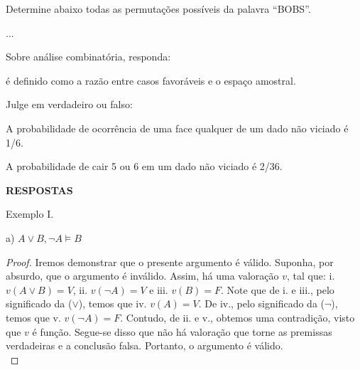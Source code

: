 \documentclass[12pt]{exam} %
\newcommand{\tf}[1][{}]{                  %
    \fillin[#1][0.25in]
}
\begin{document}
\begin{questions}
\question Determine abaixo todas as permutações possíveis da palavra \enquote{BOBS}.

\begin{solutionorbox}[1.5cm]
    ...
\end{solutionorbox}


\question Sobre análise combinatória, responda:

\question \fillin[Probabilidade] é definido como a razão entre casos favoráveis e o espaço amostral. 

\question Julge em verdadeiro ou falso:
    \begin{parts}
        \item \tf[T] A probabilidade de ocorrência de uma face qualquer de um dado não viciado é 1/6.
        \item \tf[F] A probabilidade de cair 5 ou 6 em um dado não viciado é 2/36.
    \end{parts}



\end{questions}

\vspace{1cm}
\noindent \textbf{RESPOSTAS}

Exemplo I.

\bigskip

a) $A \lor B, \neg A \vDash B$

\begin{proof}
Iremos demonstrar que o presente argumento é válido. Suponha, por absurdo, que o argumento é inválido. Assim, há uma valoração $v$, tal que:
i. $v(A\lor B)=V$, 
ii. $v(\neg A)=V$ e 
iii. $v(B)=F$. Note que de i. e iii., pelo significado da ($\lor$), temos que iv. $v(A)=V$. De iv., pelo significado da ($\neg$), temos que v. $v(\neg A)=F$. Contudo, de ii. e v., obtemos uma contradição, visto que $v$ é função. Segue-se disso que não há valoração que torne as premissas verdadeiras e a conclusão falsa. Portanto, o argumento é válido.\\
\end{proof}
\end{document}
